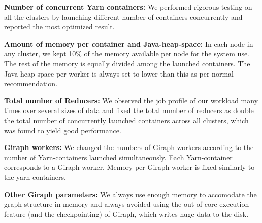 \documentclass[conference]{IEEEtran}
\begin{document}
\textbf{Number of concurrent Yarn containers:} We performed rigorous testing on all the clusters by launching different number of containers concurrently and reported the most optimized result.

\textbf{Amount of memory per container and Java-heap-space:} In each node in any cluster, we kept 10\% of the memory available per node for the system use. The rest of the memory is equally divided among the launched containers. The Java heap space per worker is always set to lower than this as per normal recommendation.

\textbf{Total number of Reducers:} We observed the job profile of our workload many times over several sizes of data and fixed the total number of reducers as double the total number of concurrently launched containers across all clusters, which was found to yield good performance. 


\textbf{Giraph workers:} We changed the numbers of Giraph workers according to the number of Yarn-containers launched simultaneously. Each Yarn-container corresponds to a Giraph-worker. Memory per Giraph-worker is fixed similarly to the yarn containers.

\textbf{Other Giraph parameters:} We always use enough memory to accomodate the graph structure in memory and always avoided using the out-of-core execution feature (and the checkpointing) of Giraph, which writes huge data to the disk.
\end{document}
